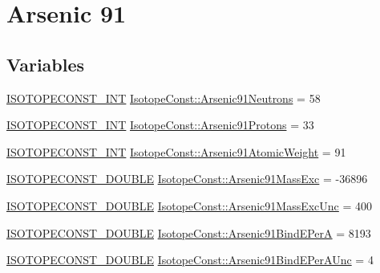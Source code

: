 \hypertarget{group___isotope_const-_arsenic-_as91}{}\section{Arsenic 91}
\label{group___isotope_const-_arsenic-_as91}
\subsection*{Variables}
\begin{DoxyCompactItemize}
\item 
\mbox{\hyperlink{group___isotope_const-_macros_ga5f18360b3e99483a35c32d789e62621c}{I\+S\+O\+T\+O\+P\+E\+C\+O\+N\+S\+T\+\_\+\+I\+NT}} \mbox{\hyperlink{group___isotope_const-_arsenic-_as91_ga96e4fe0b5e6b6c8cb6c494a3f68a6d53}{Isotope\+Const\+::\+Arsenic91\+Neutrons}} = 58
\item 
\mbox{\hyperlink{group___isotope_const-_macros_ga5f18360b3e99483a35c32d789e62621c}{I\+S\+O\+T\+O\+P\+E\+C\+O\+N\+S\+T\+\_\+\+I\+NT}} \mbox{\hyperlink{group___isotope_const-_arsenic-_as91_ga51cfcbad0698bd5255a2a4083024ff1e}{Isotope\+Const\+::\+Arsenic91\+Protons}} = 33
\item 
\mbox{\hyperlink{group___isotope_const-_macros_ga5f18360b3e99483a35c32d789e62621c}{I\+S\+O\+T\+O\+P\+E\+C\+O\+N\+S\+T\+\_\+\+I\+NT}} \mbox{\hyperlink{group___isotope_const-_arsenic-_as91_gaef2f9b8e1e5cc534b17126c294d3017f}{Isotope\+Const\+::\+Arsenic91\+Atomic\+Weight}} = 91
\item 
\mbox{\hyperlink{group___isotope_const-_macros_ga8f45a7272ce02c0b4c65c44636ed719a}{I\+S\+O\+T\+O\+P\+E\+C\+O\+N\+S\+T\+\_\+\+D\+O\+U\+B\+LE}} \mbox{\hyperlink{group___isotope_const-_arsenic-_as91_ga85941d390fe6973f66e6b8c5a23c7a34}{Isotope\+Const\+::\+Arsenic91\+Mass\+Exc}} = -\/36896
\item 
\mbox{\hyperlink{group___isotope_const-_macros_ga8f45a7272ce02c0b4c65c44636ed719a}{I\+S\+O\+T\+O\+P\+E\+C\+O\+N\+S\+T\+\_\+\+D\+O\+U\+B\+LE}} \mbox{\hyperlink{group___isotope_const-_arsenic-_as91_ga8a248d9f992147b04b651b6dcde04ce5}{Isotope\+Const\+::\+Arsenic91\+Mass\+Exc\+Unc}} = 400
\item 
\mbox{\hyperlink{group___isotope_const-_macros_ga8f45a7272ce02c0b4c65c44636ed719a}{I\+S\+O\+T\+O\+P\+E\+C\+O\+N\+S\+T\+\_\+\+D\+O\+U\+B\+LE}} \mbox{\hyperlink{group___isotope_const-_arsenic-_as91_gab36c5514f9241ebeea238a07be9b795d}{Isotope\+Const\+::\+Arsenic91\+Bind\+E\+PerA}} = 8193
\item 
\mbox{\hyperlink{group___isotope_const-_macros_ga8f45a7272ce02c0b4c65c44636ed719a}{I\+S\+O\+T\+O\+P\+E\+C\+O\+N\+S\+T\+\_\+\+D\+O\+U\+B\+LE}} \mbox{\hyperlink{group___isotope_const-_arsenic-_as91_ga96c770d91661282bc9b048e125a8bb20}{Isotope\+Const\+::\+Arsenic91\+Bind\+E\+Per\+A\+Unc}} = 4

\end{DoxyCompactItemize}
